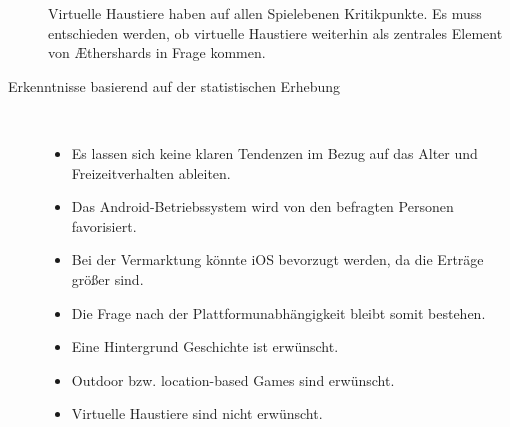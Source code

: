 \begin{description}
Virtuelle Haustiere haben auf allen Spielebenen Kritikpunkte. Es muss entschieden werden, ob virtuelle Haustiere weiterhin als zentrales Element von Æthershards in Frage kommen.






\item[Erkenntnisse basierend auf der statistischen Erhebung]  \ 
\begin{itemize}
\item Es lassen sich keine klaren Tendenzen im Bezug auf das Alter und Freizeitverhalten ableiten.
\item Das Android-Betriebssystem wird von den befragten Personen favorisiert. 
\item Bei der Vermarktung könnte iOS bevorzugt werden, da die Erträge größer sind. 
\item Die Frage nach der Plattformunabhängigkeit bleibt somit bestehen.
\item Eine Hintergrund Geschichte ist erwünscht.
\item Outdoor bzw. location-based Games sind erwünscht.
\item Virtuelle Haustiere sind nicht erwünscht.










\end{itemize}
\end{description}
